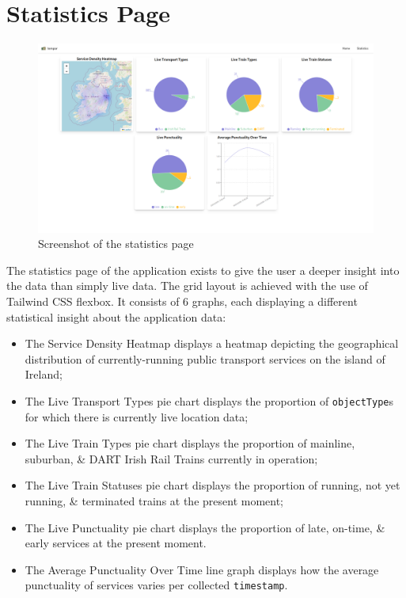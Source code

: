 \documentclass[a4paper,11pt]{report}
\begin{document}
\section{Statistics Page}
\begin{figure}[H]
    \centering
    \includegraphics[width=\textwidth]{./images/statisiticspage.png}
    \caption{Screenshot of the statistics page}
\end{figure}

The statistics page of the application exists to give the user a deeper insight into the data than simply live data.
The grid layout is achieved with the use of Tailwind CSS flexbox\supercite{flexbox}.
It consists of 6 graphs, each displaying a different statistical insight about the application data:
\begin{itemize}
  \item   The Service Density Heatmap displays a heatmap depicting the geographical distribution of currently-running public transport services on the island of Ireland;
  \item   The Live Transport Types pie chart displays the proportion of \verb|objectType|s for which there is currently live location data;  
  \item The Live Train Types pie chart displays the proportion of mainline, suburban, \& DART Irish Rail Trains currently in operation;
  \item   The Live Train Statuses pie chart displays the proportion of running, not yet running, \& terminated trains at the present moment;
  \item   The Live Punctuality pie chart displays the proportion of late, on-time, \& early services at the present moment.
  \item   The Average Punctuality Over Time line graph displays how the average punctuality of services varies per collected \verb|timestamp|.
\end{itemize}
\end{document}
